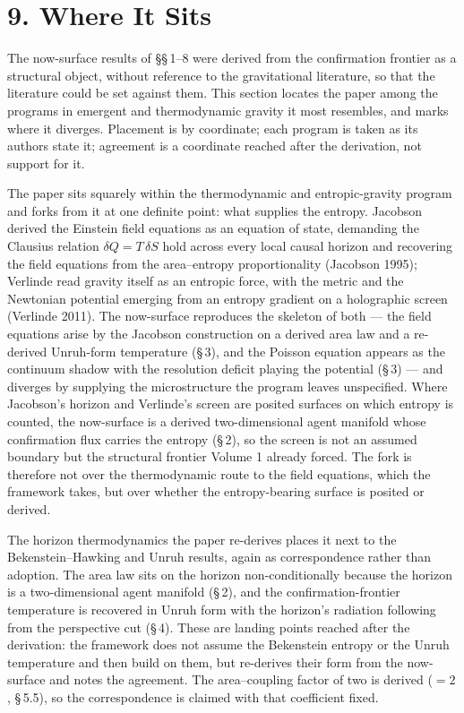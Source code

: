 \documentclass[11pt,oneside]{report}
\theoremstyle{definition}
\theoremstyle{remark}
\begin{document}
\section*{9. Where It Sits}

The now-surface results of \S\S\,1--8 were derived from the confirmation frontier as a structural object, without reference to the gravitational literature, so that the literature could be set against them. This section locates the paper among the programs in emergent and thermodynamic gravity it most resembles, and marks where it diverges. Placement is by coordinate; each program is taken as its authors state it; agreement is a coordinate reached after the derivation, not support for it.

The paper sits squarely within the thermodynamic and entropic-gravity program and forks from it at one definite point: what supplies the entropy. Jacobson derived the Einstein field equations as an equation of state, demanding the Clausius relation $\delta Q = T\,\delta S$ hold across every local causal horizon and recovering the field equations from the area--entropy proportionality (Jacobson 1995); Verlinde read gravity itself as an entropic force, with the metric and the Newtonian potential emerging from an entropy gradient on a holographic screen (Verlinde 2011). The now-surface reproduces the skeleton of both --- the field equations arise by the Jacobson construction on a derived area law and a re-derived Unruh-form temperature (\S\,3), and the Poisson equation appears as the continuum shadow with the resolution deficit playing the potential (\S\,3) --- and diverges by supplying the microstructure the program leaves unspecified. Where Jacobson's horizon and Verlinde's screen are posited surfaces on which entropy is counted, the now-surface is a derived two-dimensional agent manifold whose confirmation flux carries the entropy (\S\,2), so the screen is not an assumed boundary but the structural frontier Volume 1 already forced. The fork is therefore not over the thermodynamic route to the field equations, which the framework takes, but over whether the entropy-bearing surface is posited or derived.

The horizon thermodynamics the paper re-derives places it next to the Bekenstein--Hawking and Unruh results, again as correspondence rather than adoption. The area law sits on the horizon non-conditionally because the horizon is a two-dimensional agent manifold (\S\,2), and the confirmation-frontier temperature is recovered in Unruh form with the horizon's radiation following from the perspective cut (\S\,4). These are landing points reached after the derivation: the framework does not assume the Bekenstein entropy or the Unruh temperature and then build on them, but re-derives their form from the now-surface and notes the agreement. The area--coupling factor of two is derived (\ensuremath{= 2}, \S\,5.5), so the correspondence is claimed with that coefficient fixed.
\end{document}
